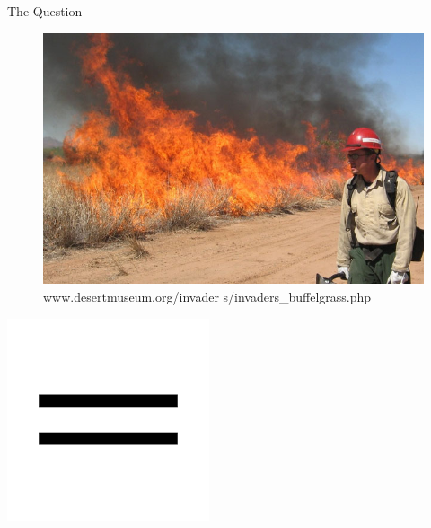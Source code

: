 \documentclass{beamer}
\begin{document}
\begin{frame}{The Question}
\begin{minipage}{0.05\textwidth}
\end{minipage}
\hfill
\begin{minipage}{0.2\textwidth}
\begin{figure}
\includegraphics[scale = 0.6]{buffelgrassfire.jpg}\\
\tiny{www.desertmuseum.org/invader s/invaders\_buffelgrass.php}
\end{figure}
\end{minipage}
\hfill
\begin{minipage}{0.1\textwidth}
\includegraphics[scale = 0.2]{equal.png}
\end{minipage}
\hfill
\begin{minipage}{0.2\textwidth}

\end{minipage}
\end{frame}
\end{document}
